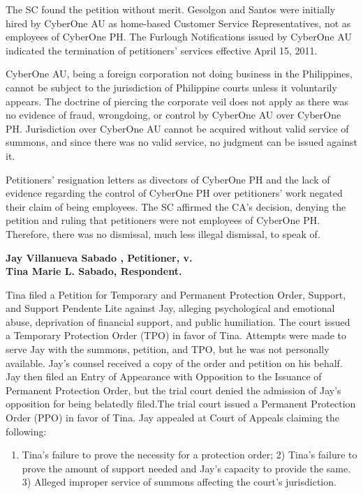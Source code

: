 \documentclass[
12pt,
oneside,
onehalfspacing,
headsepline
]{DigestCollection}
\begin{document}
The SC found the petition without merit. Gesolgon and Santos were initially hired by CyberOne AU as home-based Customer Service Representatives, not as employees of CyberOne PH. The Furlough Notifications issued by CyberOne AU indicated the termination of petitioners' services effective April 15, 2011. 

CyberOne AU, being a foreign corporation not doing business in the Philippines, cannot be subject to the jurisdiction of Philippine courts unless it voluntarily appears. The doctrine of piercing the corporate veil does not apply as there was no evidence of fraud, wrongdoing, or control by CyberOne AU over CyberOne PH. Jurisdiction over CyberOne AU cannot be acquired without valid service of summons, and since there was no valid service, no judgment can be issued against it. 

Petitioners' resignation letters as divectors of CyberOne PH and the lack of evidence regarding the control of CyberOne PH over petitioners' work negated their claim of being employees. The SC affirmed the CA’s decision, denying the petition and ruling that petitioners were not employees of CyberOne PH. Therefore, there was no dismissal, much less illegal dismissal, to speak of.

\label{c3ea15a0-0a0f-11ef-932c-63c852f65e48}


\noindent\textbf{Jay Villanueva Sabado , Petitioner, v. \\Tina Marie L. Sabado, Respondent.}

Tina filed a Petition for Temporary and Permanent Protection Order, Support, and Support Pendente Lite against Jay, alleging psychological and emotional abuse, deprivation of financial support, and public humiliation. The court issued a Temporary Protection Order (TPO) in favor of Tina. Attempts were made to serve Jay with the summons, petition, and TPO, but he was not personally available. Jay's counsel received a copy of the order and petition on his behalf. Jay then filed an Entry of Appearance with Opposition to the Issuance of Permanent Protection Order, but the trial court denied the admission of Jay's opposition for being belatedly filed.The trial court issued a Permanent Protection Order (PPO) in favor of Tina. Jay appealed at Court of Appeals claiming the following:

\begin{enumerate}
  \item Tina's failure to prove the necessity for a protection order; 2) Tina's failure to prove the amount of support needed and Jay's capacity to provide the same. 3) Alleged improper service of summons affecting the court's jurisdiction.
\end{enumerate}
\end{document}
